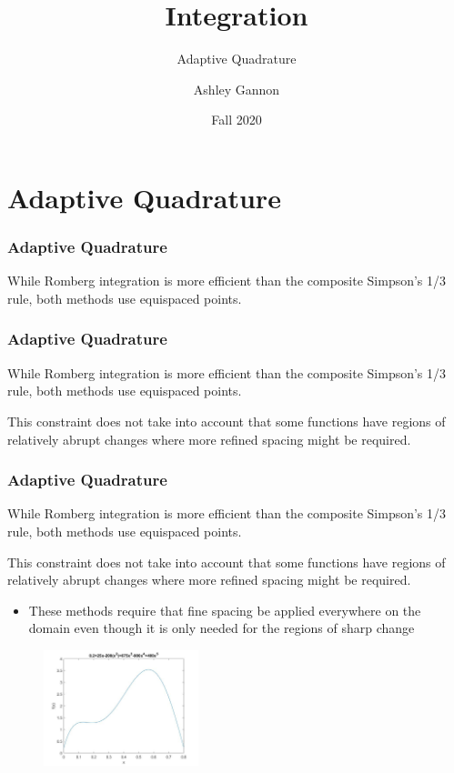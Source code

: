 \documentclass{if-beamer}
\title[Lecture 23]{Integration}
\subtitle{Adaptive Quadrature}
\author{Ashley Gannon}
\date{Fall 2020}
\begin{document}
\begin{frame}
  \titlepage
\end{frame}
\section{Adaptive Quadrature}

\begin{frame}[t]
	\frametitle{Adaptive Quadrature}
	While Romberg integration is more efficient than the composite Simpson's 1/3 rule, both methods use equispaced points.  \\\vspace{7pt}
	
\end{frame}


\begin{frame}[t]
\frametitle{Adaptive Quadrature}
While Romberg integration is more efficient than the composite Simpson's 1/3 rule, both methods use equispaced points.  \\\vspace{7pt}

This constraint does not take into account that some functions have regions of relatively abrupt changes where more refined spacing might be
required.
\end{frame}

\begin{frame}[t]
	\frametitle{Adaptive Quadrature}
	While Romberg integration is more efficient than the composite Simpson's 1/3 rule, both methods use equispaced points.  \\\vspace{7pt}
	
	This constraint does not take into account that some functions have regions of relatively abrupt changes where more refined spacing might be
	required.
	\begin{itemize}
		\item These methods require that fine spacing be applied everywhere on the domain even though it is only needed for the regions of sharp change
	\end{itemize}
	
	\begin{figure}
		\centering
		\includegraphics[width = 0.4\textwidth]{figures/example}
	\end{figure}
\end{frame}
\end{document}
